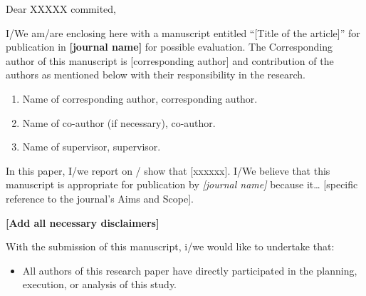 \documentclass[11pt]{Unicampletter}
\date{\vspace{-6mm} \today}
\makeatletter
\def\Where{\hspace{-1.2mm}\textbf{\color{scured}
		School of Electrical and Computer Engineering,\\ State University of Campinas
}}
\def\Address{No. 400, Albert Einstein Avenue}
\def\CityZip{Campinas, São Paulo, Brazil 13083-852%
}
\def\Email{\textbf{\color{scured}e-mail}: fxxxx@unicamp.br}
\def\newaddress{
	\Where\\ 
	\Address\\ 
	\CityZip\\ 
	\Email
}
\makeatother
\begin{document}
	\begin{letter}{
		    }   
%

%
\opening{Dear XXXXX commited,}

	I/We am/are enclosing here with a manuscript entitled “[Title of the article]” for publication in \textbf{[journal name]} for possible evaluation. The Corresponding author of this manuscript is [corresponding author] and contribution of the authors as mentioned below with their responsibility in the research.
		
		\begin{enumerate}
		    \item Name of corresponding author, corresponding author.
		    
		    \item Name of co-author (if necessary), co-author.
		    
		    \item Name of supervisor, supervisor.
		\end{enumerate}
		
    In this paper, I/we report on / show that [xxxxxx]. I/We believe that this manuscript is appropriate for publication by \textit{[journal name]} because it… [specific reference to the journal’s Aims and Scope].  
		
	\textbf{[Add all necessary disclaimers]}
		

    With the submission of this manuscript, i/we would like to undertake that:
	
	\begin{itemize}
	   \item All authors of this research paper have directly participated in the planning, execution, or analysis of this study.
	        

\end{itemize}
\end{letter}
\end{document}

